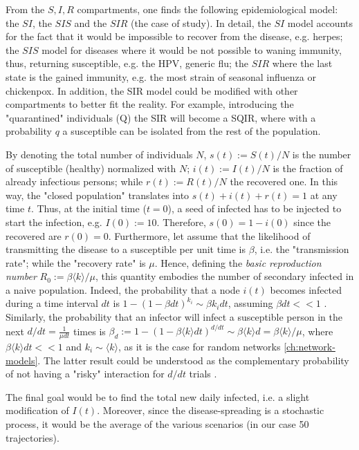 \documentclass[a4paper,10pt, oneside]{book} %
\theoremstyle{definition}
\begin{document}
From the $S,I,R$ compartments, one finds the following epidemiological model: the $SI$, the $SIS$ and the $SIR$ (the case of study). In detail, the $SI$ model accounts for the fact that it would be impossible to recover from the disease, e.g. herpes; the $SIS$ model for diseases where it would be not possible to waning immunity, thus, returning susceptible, e.g. the HPV, generic flu; the $SIR$ where the last state is the gained immunity, e.g. the most strain of seasonal influenza or chickenpox.
In addition, the SIR model could be modified with other compartments to better fit the reality. For example, introducing the "quarantined" individuals (Q) the SIR will become a SQIR, where with a probability $ q$ a susceptible can be isolated from the rest of the population.

By denoting the total number of individuals $N$, $s(t) := S(t)/N$ is the number of susceptible (healthy) normalized with $N$; $i(t):=I(t)/N$ is the fraction of already infectious persons; while $r(t) := R(t)/N$ the recovered one. In this way, the "closed population" translates into $s(t)+i(t)+r(t)=1$ at any time $t$. 
Thus, at the initial time ($t = 0$), a seed of infected has to be injected to start the infection, e.g. $I(0) := 10$. Therefore, $s(0) = 1 - i(0)$ since the recovered are $r(0) = 0$.
Furthermore, let assume that the likelihood of transmitting the disease to a susceptible per unit time is $\beta$, i.e. the "transmission rate"; while the "recovery rate" is $\mu$. Hence, defining the \textit{basic reproduction number}  $R_0 := \beta \langle k \rangle / \mu$, this quantity embodies the number of secondary infected in a naive population. Indeed, the probability that a node $i(t)$  becomes infected during a time interval $dt$ is $1-(1-\beta dt)^{k_i} \sim \beta k_i dt$, assuming $ \beta dt << 1$ \cite{barabasi::2016networkbook}. Similarly, the probability that an infector will infect a susceptible person in the next $d/dt = \frac{1}{ \mu dt}$ times is $\beta_d:= 1-(1-\beta \langle k \rangle dt)^{d/dt} \sim \beta \langle k \rangle d = \beta \langle k \rangle/\mu$, where $ \beta \langle k \rangle dt << 1$ and $k_i \sim \langle k \rangle$, as it is the case for random networks \autoref{ch:network-models}. The latter result could be understood as the complementary probability of not having a "risky" interaction for $d/dt$ trials \cite{Thurner::Appendix_NetBasedExpl}. 

The final goal would be to find the total new daily infected, i.e. a slight modification of $I(t)$. Moreover, since the disease-spreading is a stochastic process, it would be the average of the various scenarios (in our case 50 trajectories).
\end{document}
